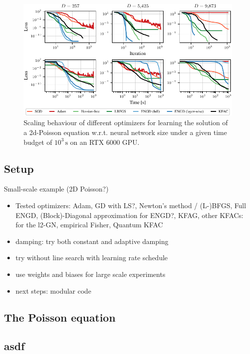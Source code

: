 \begin{figure}[tb]
  \centering
  \includegraphics{../kfac_pinns_exp/exp17_groupplot_poisson2d/loss.pdf}
  \caption{Scaling behaviour of different optimizers for learning the solution of a 2d-Poisson equation w.r.t.
    neural network size under a given time budget of $10^3\,\text{s}$ on an RTX 6000 GPU.}
  \label{fig:pedagogical-example}
\end{figure}

\subsection{Setup}

Small-scale example (2D Poisson?)
\begin{itemize}
    \item Tested optimizers: Adam, GD with LS?, Newton's method / (L-)BFGS, Full ENGD, (Block)-Diagonal approximation for ENGD?, KFAG, other KFACs: for the l2-GN, empirical Fisher, Quantum KFAC
    \item damping: try both constant and adaptive damping
    \item try without line search with learning rate schedule
\end{itemize}

\begin{itemize}
    \item use weights and biases for large scale experiments
    \item next steps: modular code
\end{itemize}

\subsection{The Poisson equation}

\subsection{asdf}

